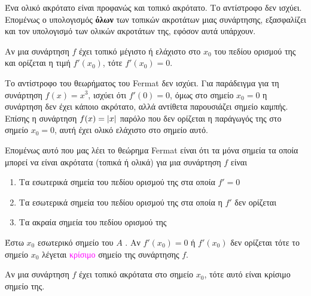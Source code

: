 \begin{rem}
    Ένα ολικό ακρότατο είναι προφανώς και τοπικό ακρότατο. Το αντίστροφο δεν ισχύει. Επομένως ο
    υπολογισμός \textbf{όλων} των τοπικών ακροτάτων μιας συνάρτησης, εξασφαλίζει και τον υπολογισμό
    των ολικών ακροτάτων της, εφόσον αυτά υπάρχουν.
\end{rem}

\begin{thm}
    Αν μια συνάρτηση $f$ έχει τοπικό μέγιστο ή ελάχιστο στο $ x_{0} $ του
    πεδίου ορισμού της και ορίζεται η τιμή $ f'(x_{0}) $, τότε $ f'(x_{0}) = 0 $.
\end{thm}

\begin{rem}
    Το αντίστροφο του θεωρήματος του \textlatin{Fermat} δεν ισχύει. Για παράδειγμα για τη συνάρτηση
    $ f(x)=x^{3} $, ισχύει ότι $ f'(0)=0 $, όμως στο σημείο $ x_{0} = 0 $ η συνάρτηση δεν έχει
    κάποιο ακρότατο, αλλά αντίθετα παρουσιάζει σημείο καμπής. Επίσης η συνάρτηση $ f(x) = \abs{x} $
    παρόλο που δεν ορίζεται η παράγωγός της στο σημείο $ x_{0} = 0 $, αυτή έχει ολικό ελάχιστο στο
    σημείο αυτό.
\end{rem}

\begin{rem}
    Επομένως αυτό που μας λέει το θεώρημα \textlatin{Fermat} είναι ότι τα μόνα σημεία τα οποία
    μπορεί να είναι ακρότατα (τοπικά ή ολικά) για μια συνάρτηση $f$ είναι 

    \begin{enumerate}
        \item Τα εσωτερικά σημεία του πεδίου ορισμού της στα οποία $ f'=0 $
        \item Τα εσωτερικά σημεία του πεδίου ορισμού της στα οποία η $ f' $ δεν ορίζεται
        \item Τα ακραία σημεία του πεδίου ορισμού της
    \end{enumerate}
\end{rem}


\begin{dfn}
    Έστω $ x_{0} $ εσωτερικό σημείο του $A$ . Αν $ f'(x_{0}) = 0 $ ή $ f'(x_{0}) $ δεν ορίζεται τότε
    το σημείο $ x_{0} $ λέγεται \textcolor{magenta}{κρίσιμο} σημείο της συνάρτησης $f$. 
\end{dfn}




    \begin{prop}
        Αν μια συνάρτηση $f$ έχει τοπικό ακρότατα στο σημείο $ x_{0} $, τότε αυτό είναι κρίσιμο
        σημείο της.
    \end{prop}

